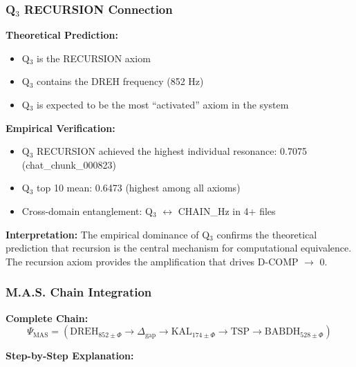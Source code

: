 \documentclass[11pt, letterpaper]{article}
\begin{document}
\subsubsection{\texorpdfstring{Q$_3$ RECURSION Connection}{Q3 RECURSION Connection}}

\textbf{Theoretical Prediction:}
\begin{itemize}
    \item Q$_3$ is the RECURSION axiom
    \item Q$_3$ contains the DREH frequency (852 Hz)
    \item Q$_3$ is expected to be the most ``activated'' axiom in the system
\end{itemize}

\textbf{Empirical Verification:}
\begin{itemize}
    \item Q$_3$ RECURSION achieved the highest individual resonance: 0.7075 (chat\_chunk\_000823)
    \item Q$_3$ top 10 mean: 0.6473 (highest among all axioms)
    \item Cross-domain entanglement: Q$_3$ $\leftrightarrow$ CHAIN\_Hz in 4+ files
\end{itemize}

\textbf{Interpretation:}
The empirical dominance of Q$_3$ confirms the theoretical prediction that recursion is the central mechanism for computational equivalence. The recursion axiom provides the amplification that drives D-COMP $\to$ 0.

\subsubsection{M.A.S. Chain Integration}

\textbf{Complete Chain:}
\begin{equation}
\Psi_{\text{MAS}} = (\text{DREH}_{\text{852}\pm\Phi} \rightarrow \Delta_{\text{gap}} \rightarrow \text{KAL}_{\text{174}\pm\Phi} \rightarrow \text{TSP} \rightarrow \text{BABDH}_{\text{528}\pm\Phi})
\end{equation}

\textbf{Step-by-Step Explanation:}
\end{document}
